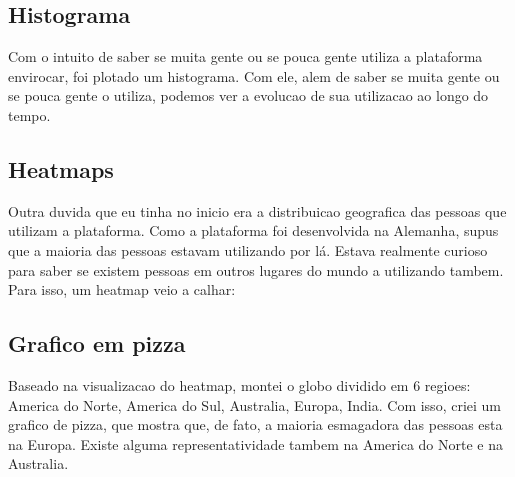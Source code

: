 \documentclass[10pt, conference]{IEEEtran}
\begin{document}
\subsection{Histograma}
Com o intuito de saber se muita gente ou se pouca gente utiliza a plataforma envirocar,
foi plotado um histograma. Com ele, alem de saber se muita gente ou se pouca gente o utiliza,
podemos ver a evolucao de sua utilizacao ao longo do tempo.



\subsection{Heatmaps}

Outra duvida que eu tinha no inicio era a distribuicao geografica das pessoas que utilizam a plataforma. 
Como a plataforma foi desenvolvida na Alemanha, supus que a maioria das pessoas estavam utilizando por lá. 
Estava realmente curioso para saber se existem pessoas em outros lugares do mundo a utilizando tambem. 
Para isso, um heatmap veio a calhar:



\subsection{Grafico em pizza}

Baseado na visualizacao do heatmap, montei o globo dividido em 6 regioes: America do Norte, America do Sul,
Australia, Europa, India. Com isso, criei um grafico de pizza, que mostra que, de fato, a maioria esmagadora
das pessoas esta na Europa. Existe alguma representatividade tambem na America do Norte e na Australia.




\end{document}
